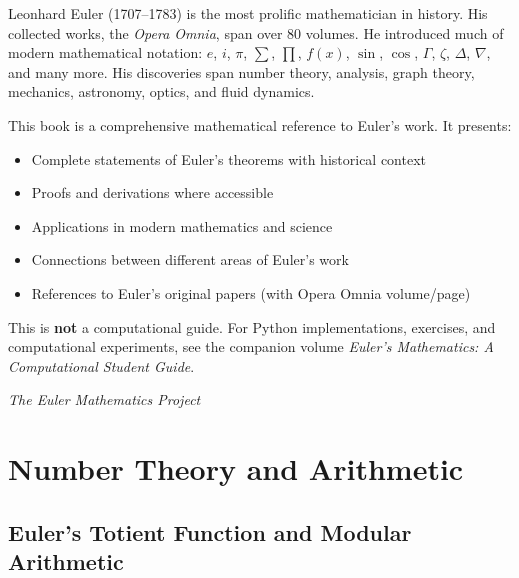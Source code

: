 \documentclass[11pt,a4paper,twoside]{book}
\theoremstyle{eulerstyle}
\theoremstyle{definition}
\begin{document}
Leonhard Euler (1707--1783) is the most prolific mathematician in history. His collected works, the \emph{Opera Omnia}, span over 80 volumes. He introduced much of modern mathematical notation: $e$, $i$, $\pi$, $\sum$, $\prod$, $f(x)$, $\sin$, $\cos$, $\Gamma$, $\zeta$, $\Delta$, $\nabla$, and many more. His discoveries span number theory, analysis, graph theory, mechanics, astronomy, optics, and fluid dynamics.

This book is a comprehensive mathematical reference to Euler's work. It presents:
\begin{itemize}
    \item Complete statements of Euler's theorems with historical context
    \item Proofs and derivations where accessible
    \item Applications in modern mathematics and science
    \item Connections between different areas of Euler's work
    \item References to Euler's original papers (with Opera Omnia volume/page)
\end{itemize}

This is \textbf{not} a computational guide. For Python implementations, exercises, and computational experiments, see the companion volume \emph{Euler's Mathematics: A Computational Student Guide}.

\vspace{1cm}
\begin{flushright}
\textit{The Euler Mathematics Project}
\end{flushright}

\cleardoublepage

\tableofcontents

\cleardoublepage

\mainmatter

\part{Number Theory and Arithmetic}
\label{part:number_theory}

\chapter{Euler's Totient Function and Modular Arithmetic}
\label{ch:totient}
\end{document}
